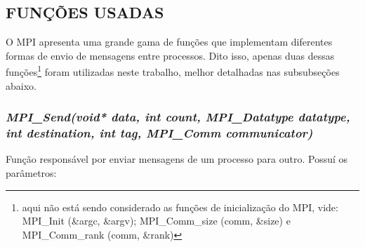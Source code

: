 	\subsection{\normalsize FUNÇÕES USADAS}\label{mpi}
		O MPI apresenta uma grande gama de funções que implementam diferentes formas de envio de mensagens entre processos. Dito isso, apenas duas dessas funções\footnote{aqui não está sendo considerado as funções de inicialização do MPI, vide:\\
		MPI\_Init (\&argc, \&argv);
		MPI\_Comm\_size (comm, \&size) e
		MPI\_Comm\_rank (comm, \&rank)} foram utilizadas neste trabalho, melhor detalhadas nas subsubseções abaixo.
		
		\subsubsection{\normalsize \textit{MPI\_Send(void* data, int count, MPI\_Datatype datatype, int destination, int tag, MPI\_Comm communicator)}}\label{send}
			Função responsável por enviar mensagens de um processo para outro. Possuí os parâmetros:
